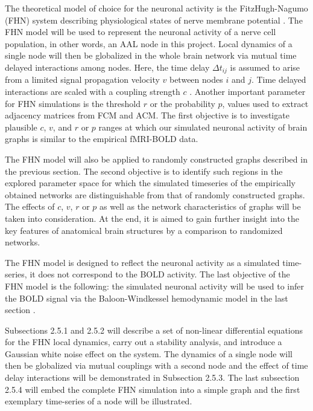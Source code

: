 The theoretical model of choice for the neuronal activity is the FitzHugh-Nagumo (FHN) system describing physiological states of nerve membrane potential \citep{FIT61, NAG62}. The FHN model will be used to represent the neuronal activity of a nerve cell population, in other words, an AAL node in this project. Local dynamics of a single node will then be globalized in the whole brain network via mutual time delayed interactions among nodes. Here, the time delay $\Delta t_{ij}$ is assumed to arise from a limited signal propagation velocity $v$ between nodes $i$ and $j$. Time delayed interactions are scaled with a coupling strength $c$ \citep{GHO08, GHO08a, DEC09}. Another important parameter for FHN simulations is the threshold $r$ or the probability $p$, values used to extract adjacency matrices from FCM and ACM. The first objective is to investigate plausible $c$, $v$, and $r$ or $p$ ranges at which our simulated neuronal activity of brain graphs is similar to the empirical fMRI-BOLD data. 

The FHN model will also be applied to randomly constructed graphs described in the previous section. The second objective is to identify such regions in the explored parameter space for which the simulated timeseries of the empirically obtained networks are distinguishable from that of randomly constructed graphs. The effects of $c$, $v$, $r$ or $p$ as well as the network characteristics of graphs will be taken into consideration. At the end, it is aimed to gain further insight into the key features of anatomical brain structures by a comparison to randomized networks.  
 
The FHN model is designed to reflect the neuronal activity as a simulated time-series, it does not correspond to the BOLD activity. The last objective of the FHN model is the following: the simulated neuronal activity will be used to infer the BOLD signal via the Baloon-Windkessel hemodynamic model in the last section \citep{FRI00}. 

Subsections 2.5.1 and 2.5.2 will describe a set of non-linear differential equations for the FHN local dynamics, carry out a stability analysis, and introduce a Gaussian white noise effect on the system. The dynamics of a single node will then be globalized via mutual couplings with a second node and the effect of time delay interactions will be demonstrated in Subsection 2.5.3. The last subsection 2.5.4 will embed the complete FHN simulation into a simple graph and the first exemplary time-series of a node will be illustrated. 





